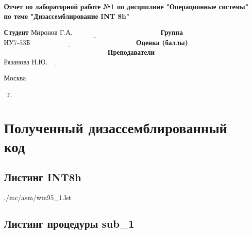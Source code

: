 \documentclass[12pt]{extreport}
\begin{document}
\begin{titlepage}
	\begin{center}
		\noindent\begin{minipage}{1.3\textwidth}\centering
			\Large\textbf{  Отчет по лабораторной работе №1}\newline
			\textbf{по дисциплине "Операционные системы"}\newline
			\textbf{по теме "Дизассемблирование INT 8h"}\newline\newline
		\end{minipage}
	\end{center}
	
	\noindent\textbf{Студент} $\underline{\text{Миронов Г.А.~~~~~~~~~~~~~~~~~~~~~~~~~~~~~~~~~~~~~~}}$\newline\newline
	\noindent\textbf{Группа} $\underline{\text{ИУ7-53Б~~~~~~~~~~~~~~~~~~~~~~~~~~~~~~~~~~~~~~~~~~~~~~}}$\newline\newline
	\noindent\textbf{Оценка (баллы)} $\underline{\text{~~~~~~~~~~~~~~~~~~~~~~~~~~~~~~~~~~~~~~~~~~~~~}}$\newline\newline
	\noindent\textbf{Преподаватели} $\underline{\text{Рязанова Н.Ю.~~~~~~~~~~~~~~~~~~~~~~~~~~}}$\newline\newline\newline
	
	\bgroup 
	\centering
		\vfill
		
		Москва
		
		\the\year
		~г.

	\egroup 
\end{titlepage}

\chapter{Полученный дизассемблированный код}

\section{Листинг INT8h} 

\begin{lstinputlisting}[
	caption={Листинг INT 8h},
	label={lst:int8},
	style={asm}
]{./inc/asm/win95_1.lst}
\end{lstinputlisting}

\section{Листинг процедуры sub\_1}
\end{document}
